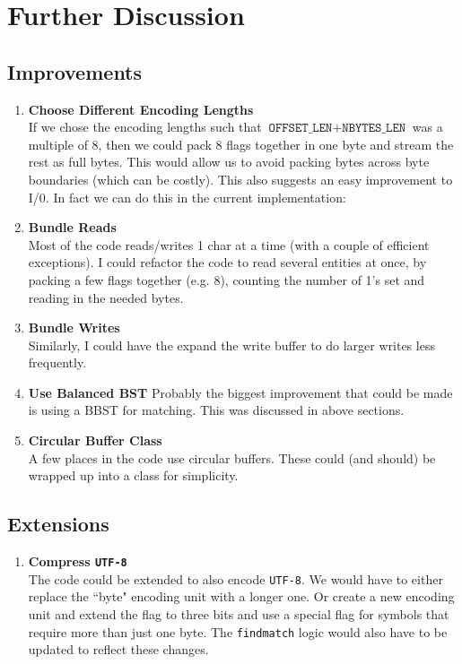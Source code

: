 \documentclass[a4paper]{article}
\begin{document}
\section{Further Discussion}
\subsection{Improvements}
\begin{enumerate}
\item \textbf{Choose Different Encoding Lengths}\\ 
If we chose the encoding lengths such that \(\texttt{OFFSET\_LEN} + \texttt{NBYTES\_LEN}\) was a multiple of 8, then we could pack 8 flags together in one byte and stream the rest as full bytes. This would allow us to avoid packing bytes across byte boundaries (which can be costly). This also suggests an easy improvement to I/0. In fact we can do this in the current implementation:
\item \textbf{Bundle Reads}\\
Most of the code reads/writes 1 char at a time (with a couple of efficient exceptions). I could refactor the code to read several entities at once, by packing a few flags together (e.g. 8), counting the number of 1's set and reading in the needed bytes.
\item \textbf{Bundle Writes}\\
Similarly, I could have the expand the write buffer to do larger writes less frequently.
\item \textbf{Use Balanced BST}
Probably the biggest improvement that could be made is using a BBST for matching. This was discussed in above sections.
\item \textbf{Circular Buffer Class}\\
A few places in the code use circular buffers. These could (and should) be wrapped up into a class for simplicity.
\end{enumerate}


\subsection{Extensions}
\begin{enumerate}
\item \textbf{Compress \texttt{UTF-8}}\\
The code could be extended to also encode \texttt{UTF-8}. 
We would have to either replace the ``byte" encoding unit with a longer one. Or create a new encoding unit and extend the flag to three bits and use a special flag for symbols that require more than just one byte. The \texttt{findmatch} logic would also have to be updated to reflect these changes.
\end{enumerate}
\end{document}
